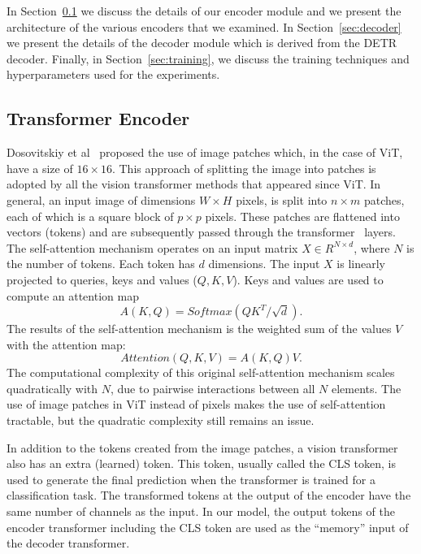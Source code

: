 \documentclass[runningheads]{llncs}
\begin{document}
In Section~\ref{sec:encoder} we discuss the details of our encoder module and 
we present the architecture of the various encoders that we examined. In Section~\ref{sec:decoder} we present the details of the decoder module which is 
derived from the DETR decoder. Finally, in Section~\ref{sec:training},
we discuss the training techniques and hyperparameters used for the experiments.


\subsection{Transformer Encoder}
\label{sec:encoder}
Dosovitskiy et al~\cite{dosovitskiy2020image} proposed the use of image patches which, in the case of ViT, have a size of $16 \times 16$. This approach of splitting the image into patches 
is adopted by all the vision transformer methods that appeared since ViT.
In general, an input image of dimensions $W \times H$ pixels, is split into $n \times m$ patches, each of which is a square block of $p \times p$ pixels.
These patches are flattened into vectors (tokens) and are subsequently passed through the transformer~\cite{vaswani2017attention} layers.  The self-attention mechanism operates on an input matrix $X \in R^{N \times d}$, where $N$ is the number of tokens. Each token has $d$ dimensions.
The input $X$ is linearly projected to queries, keys and values ($Q, K, V$).
Keys and values are used to compute an attention map 
$$A(K, Q) = Softmax(QK^{T}/ \sqrt{d}).$$ 
The results of the self-attention mechanism is the weighted sum 
of the values $V$ with the attention map: 
$$Attention(Q,K,V) = A(K,Q) V.$$
The computational complexity of this original self-attention mechanism scales quadratically with $N$,  due to pairwise interactions between all $N$ elements. 
The use of image patches in ViT instead of pixels makes the use of self-attention tractable, but 
the quadratic complexity still remains an issue.

In addition to the tokens created from the image patches, a vision transformer also has 
an extra (learned) token. This token, usually called the CLS token, is used to generate 
the final prediction when the transformer is trained for a classification task. 
The transformed tokens at the output of the encoder have the same number of channels as the input.
In our model, the output tokens of the encoder transformer including the 
CLS token are used  as the ``memory'' input of the decoder transformer. 
\end{document}
